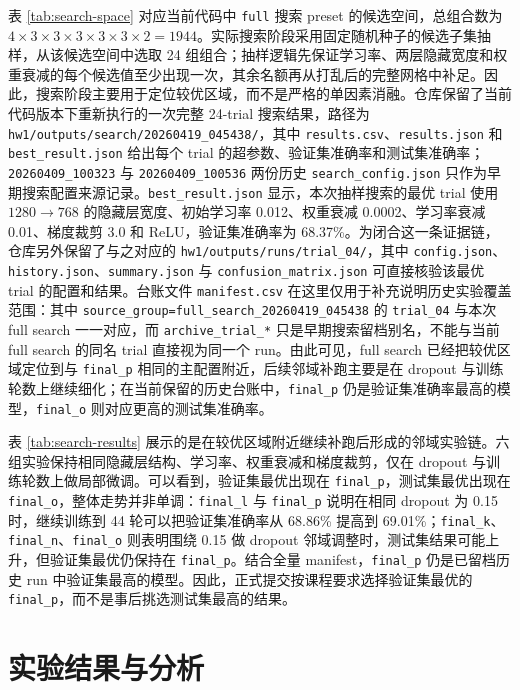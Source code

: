 \documentclass[lang=cn,a4paper,newtx,code=minted]{elegantpaper}
\begin{document}
表 \ref{tab:search-space} 对应当前代码中 \texttt{full} 搜索 preset 的候选空间，总组合数为 $4\times3\times3\times3\times3\times3\times2=1944$。实际搜索阶段采用固定随机种子的候选子集抽样，从该候选空间中选取 24 组组合；抽样逻辑先保证学习率、两层隐藏宽度和权重衰减的每个候选值至少出现一次，其余名额再从打乱后的完整网格中补足。因此，搜索阶段主要用于定位较优区域，而不是严格的单因素消融。仓库保留了当前代码版本下重新执行的一次完整 24-trial 搜索结果，路径为 \nolinkurl{hw1/outputs/search/20260419_045438/}，其中 \texttt{results.csv}、\texttt{results.json} 和 \texttt{best\_result.json} 给出每个 trial 的超参数、验证集准确率和测试集准确率；\texttt{20260409\_100323} 与 \texttt{20260409\_100536} 两份历史 \texttt{search\_config.json} 只作为早期搜索配置来源记录。\texttt{best\_result.json} 显示，本次抽样搜索的最优 trial 使用 $1280\rightarrow768$ 的隐藏层宽度、初始学习率 0.012、权重衰减 0.0002、学习率衰减 0.01、梯度裁剪 3.0 和 ReLU，验证集准确率为 68.37\%。为闭合这一条证据链，仓库另外保留了与之对应的 \nolinkurl{hw1/outputs/runs/trial_04/}，其中 \texttt{config.json}、\texttt{history.json}、\texttt{summary.json} 与 \texttt{confusion\_matrix.json} 可直接核验该最优 trial 的配置和结果。台账文件 \texttt{manifest.csv} 在这里仅用于补充说明历史实验覆盖范围：其中 \texttt{source\_group=full\_search\_20260419\_045438} 的 \texttt{trial\_04} 与本次 full search 一一对应，而 \texttt{archive\_trial\_*} 只是早期搜索留档别名，不能与当前 full search 的同名 trial 直接视为同一个 run。由此可见，full search 已经把较优区域定位到与 \texttt{final\_p} 相同的主配置附近，后续邻域补跑主要是在 dropout 与训练轮数上继续细化；在当前保留的历史台账中，\texttt{final\_p} 仍是验证集准确率最高的模型，\texttt{final\_o} 则对应更高的测试集准确率。

表 \ref{tab:search-results} 展示的是在较优区域附近继续补跑后形成的邻域实验链。六组实验保持相同隐藏层结构、学习率、权重衰减和梯度裁剪，仅在 dropout 与训练轮数上做局部微调。可以看到，验证集最优出现在 \texttt{final\_p}，测试集最优出现在 \texttt{final\_o}，整体走势并非单调：\texttt{final\_l} 与 \texttt{final\_p} 说明在相同 dropout 为 0.15 时，继续训练到 44 轮可以把验证集准确率从 68.86\% 提高到 69.01\%；\texttt{final\_k}、\texttt{final\_n}、\texttt{final\_o} 则表明围绕 0.15 做 dropout 邻域调整时，测试集结果可能上升，但验证集最优仍保持在 \texttt{final\_p}。结合全量 manifest，\texttt{final\_p} 仍是已留档历史 run 中验证集最高的模型。因此，正式提交按课程要求选择验证集最优的 \texttt{final\_p}，而不是事后挑选测试集最高的结果。

\section{实验结果与分析}
\end{document}
